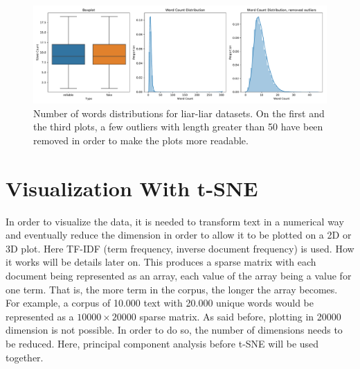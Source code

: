 \begin{figure}[h]
  \centering
  \includegraphics[width=\textwidth]{images/data_exploration/liar_liar_summary.pdf}
  \caption{Number of words distributions for liar-liar datasets. On the first and the third plots, a few outliers with length greater than 50 have been removed in order to make the plots more readable.}
  \label{fig:data_explo:summary3}
\end{figure}
\section{Visualization With t-SNE}
In order to visualize the data, it is needed to transform text in a numerical way and eventually reduce the dimension in order to allow it to be plotted on a 2D or 3D plot. Here TF-IDF (term frequency, inverse document frequency\cite{Robertson2004,Jones2004}) is used. How it works will be details later on. This produces a sparse matrix with each document being represented as an array, each value of the array being a value for one term. That is, the more term in the corpus, the longer the array becomes. For example, a corpus of 10.000 text with 20.000 unique words would be represented as a $10000 \times 20000$ sparse matrix. As said before, plotting in 20000 dimension is not possible. In order to do so, the number of dimensions needs to be reduced. Here, principal component analysis before t-SNE\cite{Maaten2008} will be used together. \\

